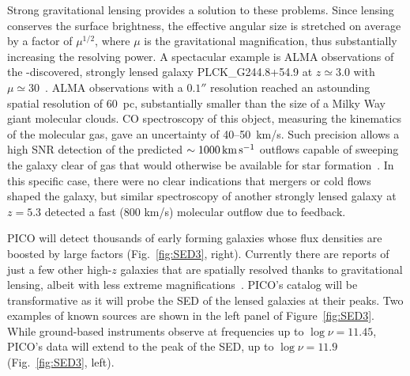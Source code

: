 \documentclass[PICOReport.tex]{subfiles}
\begin{document}
Strong gravitational lensing provides a solution to these problems. Since lensing conserves the surface brightness, the effective angular size is stretched on average by a factor of $\mu^{1/2}$, where $\mu$ is the gravitational magnification, thus substantially increasing the resolving power. A spectacular example is ALMA observations of the \planck-discovered, strongly lensed galaxy PLCK\_G244.8\-+54.9 at $z \simeq 3.0$  with $\mu \simeq 30$~\citep{Canameras2017ALMA}. ALMA observations with a $0.1''$ resolution reached an astounding spatial resolution of 60~pc, substantially smaller than the size of a Milky Way giant molecular clouds. CO spectroscopy of this object, measuring the kinematics of the molecular gas, gave an uncertainty of 40--50~km/s. Such precision allows a high \ac{SNR} detection of the predicted $\sim 1000\,\hbox{km}\,\hbox{s}^{-1}$  outflows capable of sweeping the galaxy clear of gas that would otherwise be available for star formation~\citep{KingPounds2015}. In this specific case, there were no clear indications that mergers or cold flows shaped the galaxy, but similar spectroscopy of another strongly lensed galaxy at $z=5.3$ detected a fast (800 km/s) molecular outflow due to feedback. 



PICO will detect thousands of early forming galaxies whose flux densities are boosted by large factors (Fig.~\ref{fig:SED3}, right).
Currently there are reports of just a few other high-$z$ galaxies that are spatially resolved thanks to gravitational lensing, albeit with less extreme magnifications~\citep{Dye2018, Lamarche2018, Sharda2018}. PICO's catalog will be transformative as it will probe the \ac{SED} of the lensed galaxies at their peaks. Two examples of known sources are shown in the left panel of Figure~\ref{fig:SED3}. While ground-based instruments observe at frequencies up to $\log \nu = 11.45$, PICO's data will extend to the peak of the \ac{SED}, up to $\log \nu = 11.9$ (Fig.~\ref{fig:SED3}, left).
\end{document}
